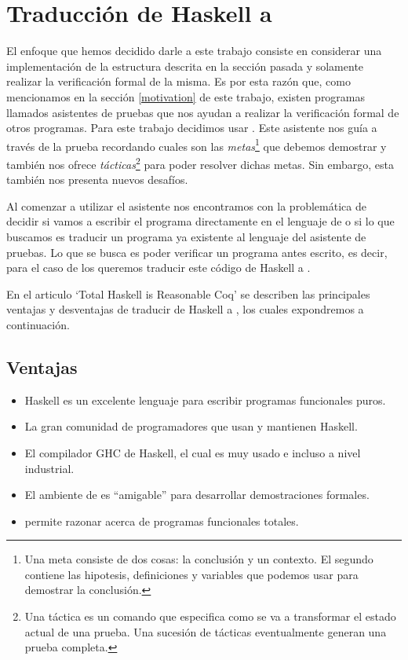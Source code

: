 \section{Traducción de Haskell a {\coq}}
El enfoque que hemos decidido darle a este trabajo consiste en considerar una implementaci\'on de 
la estructura descrita en la secci\'on pasada y solamente realizar la verificaci\'on formal de la 
misma. Es por esta raz\'on que, como mencionamos en la secci\'on \ref{motivation} de este trabajo, 
existen programas llamados asistentes de pruebas que nos ayudan a realizar la verificaci\'on formal 
de otros programas. Para este trabajo decidimos usar {\coq}. Este asistente nos gu\'ia a través de 
la prueba recordando cuales son las \textit{metas}\footnote{Una meta consiste de dos cosas: la 
conclusi\'on y un contexto. El segundo contiene las hipotesis, definiciones y variables que podemos 
usar para demostrar la conclusi\'on.\cite{GOALS}} que debemos demostrar y tambi\'en nos ofrece 
\textit{t\'acticas}\footnote{Una táctica es un comando que especifica como se va a transformar el 
estado actual de una prueba. Una sucesión de tácticas eventualmente generan una prueba 
completa.\cite{TACTICS}} para poder resolver dichas metas. Sin embargo, esta tambi\'en nos presenta 
nuevos desaf\'ios.

Al comenzar a utilizar el asistente nos encontramos con la problem\'atica de decidir si vamos a 
escribir el programa directamente en el lenguaje de {\coq} o si lo que buscamos es traducir un 
programa ya existente al lenguaje del asistente de pruebas. Lo que se busca es poder verificar un 
programa antes escrito, es decir, para el caso de los {\arns} queremos traducir este código de 
Haskell a {\coq}.

En el articulo `Total Haskell is Reasonable Coq' \cite{thrc} se describen las principales ventajas
y desventajas de traducir de Haskell a {\coq}, los cuales expondremos a continuaci\'on.

\subsection{Ventajas}
\begin{itemize}
    \item Haskell es un excelente lenguaje para escribir programas funcionales puros.
    \item La gran comunidad de programadores que usan y mantienen Haskell.
    \item El compilador GHC de Haskell, el cual es muy usado e incluso a nivel industrial.
    \item El ambiente de {\coq} es ``amigable'' para desarrollar demostraciones formales.
    \item {\coq} permite razonar acerca de programas funcionales totales.
\end{itemize}

